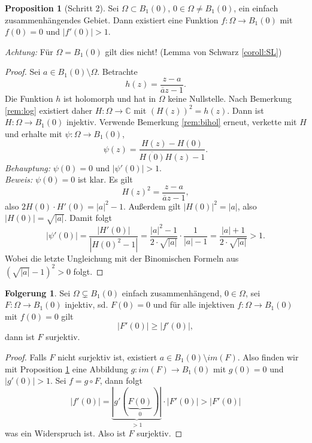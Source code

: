 \documentclass[11pt,titlepage]{article}
\theoremstyle{definition}
\newtheorem{corollary}[theorem]{Folgerung}
\newtheorem{proposition}[theorem]{Proposition}
\theoremstyle{remark}
\begin{document}
	\begin{proposition}[Schritt 2] \label{prop:schritt2}
		Sei $\Omega\subset B_1(0)$, $0\in\Omega\neq B_1(0)$, 
		ein einfach zusammenhängendes Gebiet. Dann existiert eine 
		Funktion $f:\Omega\to B_1(0)$ mit $f(0)=0$ und $|f'(0)|>1$.
	\end{proposition}
	
	\textsl{Achtung:} Für $\Omega=B_1(0)$ gilt dies nicht! (Lemma von Schwarz \ref{coroll:SL})
	
	\begin{proof}
		Sei $a\in B_1(0)\setminus\Omega$. Betrachte
		\[ h(z)=\frac{z-a}{\overline{a}z-1} .\]
		Die Funktion $h$ ist holomorph und hat in $\Omega$ keine Nullstelle. Nach Bemerkung 
		\ref{rem:log} existiert daher $H:\Omega\to\mathbb{C}$ mit $(H(z))^2=h(z)$. Dann ist 
		$H:\Omega\to B_1(0)$ injektiv. Verwende Bemerkung \ref{rem:bihol} erneut, verkette mit $H$ 
		und erhalte mit $\psi:\Omega\to B_1(0)$,
		\[ \psi(z)=\frac{H(z)-H(0)}{\overline{H(0)}H(z)-1}. \]
		\textsl{Behauptung:} $\psi(0)=0$ und $|\psi'(0)|>1$. \\
		\textsl{Beweis:} $\psi(0)=0$ ist klar. Es gilt 
		\[ H(z)^2=\frac{z-a}{\overline{a}z-1}, \]
		also $2H(0)\cdot H'(0)=|a|^2-1$. Außerdem gilt $|H(0)|^2=|a|$, also $|H(0)|=\sqrt{|a|}$. 
		Damit folgt
		\[ \left| \psi'(0)\right|=\frac{|H'(0)|}{|H(0)^2-1|}=\frac{|a|^2 -1}{2\cdot\sqrt{|a|}}\cdot\frac{1}{|a|-1}
		=\frac{|a|+1}{2\cdot\sqrt{|a|}}>1 .\]
		Wobei die letzte Ungleichung mit der Binomischen Formeln aus $\left(\sqrt{|a|}-1\right)^2>0$ folgt.
	\end{proof}
	
	\begin{corollary} \label{coroll:injsurj}
		Sei $\Omega\subsetneq B_1(0)$ einfach zusammenhängend, $0\in \Omega$, sei $F:\Omega\to B_1(0)$ 
		injektiv, sd. 
		$F(0)=0$ und für alle injektiven $f:\Omega\to B_1(0)$ mit $f(0)=0$ gilt
		\[ |F'(0)|\geq |f'(0)| ,\]
		dann ist $F$ surjektiv.
	\end{corollary}
	
	\begin{proof}
		Falls $F$ nicht surjektiv ist, existiert $a\in B_1(0)\setminus im(F)$. Also finden wir mit Proposition
		 \ref{prop:schritt2} 
		eine Abbildung $g: im(F)\to B_1(0)$ mit $g(0)=0$ und $|g'(0)|>1$. Sei $f=g\circ F$, dann folgt
		\[ |f'(0)|= \underbrace{|g'(\underbrace{F(0)}_{0})|}_{>1} \cdot |F'(0)| > |F'(0)| \]
		was ein Widerspruch ist. Also ist $F$ surjektiv.
	\end{proof}
	
\end{document}
